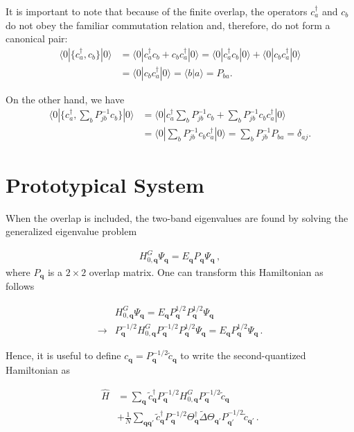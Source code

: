 \documentclass[aps, prb, superscriptaddress, preprint, floatfix]{revtex4-1}
\begin{document}
It is important to note that because of the finite overlap, the operators $c^\dagger_a$ and $c_b$ do not obey the familiar commutation relation and, therefore, do not form a canonical pair:
%
\begin{align}
	\langle 0|\{c_a^\dagger, c_b\}|0\rangle 
	&= 
	\langle 0|c_a^\dagger c_b + c_b c_a^\dagger|0\rangle
	= 
	\langle 0|c_a^\dagger c_b|0\rangle
	+
	\langle 0|c_b c_a^\dagger|0\rangle
	\nonumber
	\\
	&= 
	\langle 0|c_b c_a^\dagger|0\rangle = \langle b| a\rangle = P_{ba}.
\end{align}
%

On the other hand, we have
%
\begin{align}
	\langle 0|\{c_a^\dagger, \sum_{b}P_{jb}^{-1} c_b\}|0\rangle 
	&= 
	\langle 0|c_a^\dagger \sum_{b}P_{jb}^{-1} c_b + \sum_{b}P_{jb}^{-1} c_b c_a^\dagger|0\rangle
	\nonumber
	\\
	&= 
	\langle 0|\sum_{b}P_{jb}^{-1} c_b c_a^\dagger|0\rangle  = \sum_{b}P_{jb}^{-1}P_{ba} = \delta_{aj}.
\end{align}
%

\section{Prototypical System}




When the overlap is included, the two-band eigenvalues are found by solving the generalized eigenvalue problem

%
\begin{align}
	H^G_{0,\mathbf{q}}\Psi_\mathbf{q} = E_\mathbf{q}P_\mathbf{q} \Psi_\mathbf{q}\,,
\end{align}
%
where $P_\mathbf{q}$ is a $2\times 2$ overlap matrix. One can transform this Hamiltonian as follows

%
\begin{align}
	&H^G_{0,\mathbf{q}}\Psi_\mathbf{q} = E_\mathbf{q}P^{1/2}_\mathbf{q} P^{1/2}_\mathbf{q} \Psi_\mathbf{q}
	\nonumber
	\\
	\rightarrow &P^{-1/2}_\mathbf{q}H^G_{0,\mathbf{q}}P^{-1/2}_\mathbf{q}P^{1/2}_\mathbf{q}\Psi_\mathbf{q} = E_\mathbf{q} P^{1/2}_\mathbf{q} \Psi_\mathbf{q}\,.
\end{align}
%

Hence, it is useful to define $c_\mathbf{q} = P_\mathbf{q}^{-1/2}\tilde{c}_\mathbf{q}$ to write the second-quantized Hamiltonian as

%
\begin{align}
    \hat{H} &= \sum_{\mathbf{q}} \tilde{c}_\mathbf{q}^\dagger P_\mathbf{q}^{-1/2}
    H_{0,\mathbf{q}}^G 
    P_\mathbf{q}^{-1/2}\tilde{c}_\mathbf{q}
    \nonumber
    \\
    &+
    \frac{1}{N}\sum_{\mathbf{qq}'} \tilde{c}_\mathbf{q}^\dagger P_\mathbf{q}^{-1/2} \Theta_{\mathbf{q}}^\dagger \tilde{\Delta} \Theta_{\mathbf{q}'}P_{\mathbf{q}'}^{-1/2}\tilde{c}_{\mathbf{q}'}
    \,.
    \label{eqn:H_QFT_2}
\end{align}
%
\end{document}
